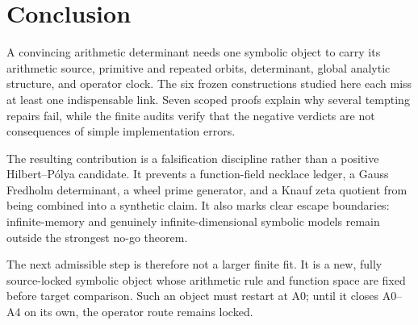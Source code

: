\section{Conclusion}
\label{sec:conclusion}

A convincing arithmetic determinant needs one symbolic object to carry its
arithmetic source, primitive and repeated orbits, determinant, global analytic
structure, and operator clock.  The six frozen constructions studied here
each miss at least one indispensable link.  Seven scoped proofs explain why
several tempting repairs fail, while the finite audits verify that the
negative verdicts are not consequences of simple implementation errors.

The resulting contribution is a falsification discipline rather than a
positive Hilbert--Pólya candidate.  It prevents a function-field necklace
ledger, a Gauss Fredholm determinant, a wheel prime generator, and a Knauf
zeta quotient from being combined into a synthetic claim.  It also marks
clear escape boundaries: infinite-memory and genuinely
infinite-dimensional symbolic models remain outside the strongest no-go
theorem.

The next admissible step is therefore not a larger finite fit.  It is a new,
fully source-locked symbolic object whose arithmetic rule and function space
are fixed before target comparison.  Such an object must restart at A0; until
it closes A0--A4 on its own, the operator route remains locked.
